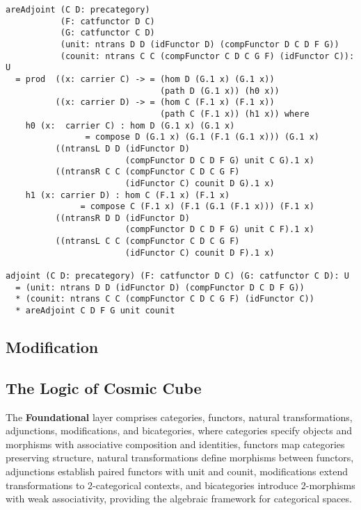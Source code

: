 \documentclass{article}
\begin{document}
\newpage
\begin{lstlisting}
areAdjoint (C D: precategory)
           (F: catfunctor D C)
           (G: catfunctor C D)
           (unit: ntrans D D (idFunctor D) (compFunctor D C D F G))
           (counit: ntrans C C (compFunctor C D C G F) (idFunctor C)): U
  = prod  ((x: carrier C) -> = (hom D (G.1 x) (G.1 x))
                               (path D (G.1 x)) (h0 x))
          ((x: carrier D) -> = (hom C (F.1 x) (F.1 x))
                               (path C (F.1 x)) (h1 x)) where
    h0 (x:  carrier C) : hom D (G.1 x) (G.1 x)
                = compose D (G.1 x) (G.1 (F.1 (G.1 x))) (G.1 x)
          ((ntransL D D (idFunctor D)
                        (compFunctor D C D F G) unit C G).1 x)
          ((ntransR C C (compFunctor C D C G F)
                        (idFunctor C) counit D G).1 x)
    h1 (x: carrier D) : hom C (F.1 x) (F.1 x)
               = compose C (F.1 x) (F.1 (G.1 (F.1 x))) (F.1 x)
          ((ntransR D D (idFunctor D)
                        (compFunctor D C D F G) unit C F).1 x)
          ((ntransL C C (compFunctor C D C G F)
                        (idFunctor C) counit D F).1 x)

adjoint (C D: precategory) (F: catfunctor D C) (G: catfunctor C D): U
  = (unit: ntrans D D (idFunctor D) (compFunctor D C D F G))
  * (counit: ntrans C C (compFunctor C D C G F) (idFunctor C))
  * areAdjoint C D F G unit counit
\end{lstlisting}

\subsection{Modification}

\newpage
\subsection{The Logic of Cosmic Cube}

\hspace{0.5cm}The {\bf Foundational} layer comprises categories, functors, natural transformations, adjunctions, modifications, and bicategories, where categories specify objects and morphisms with associative composition and identities, functors map categories preserving structure, natural transformations define morphisms between functors, adjunctions establish paired functors with unit and counit, modifications extend transformations to 2-categorical contexts, and bicategories introduce 2-morphisms with weak associativity, providing the algebraic framework for categorical spaces.
\end{document}
